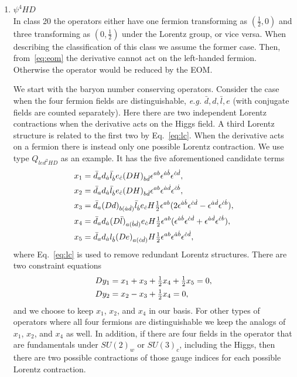 \begin{enumerate}
\item $\psi^4HD$ \\

In class 20 the operators either have one fermion transforming as $(\tfrac{1}{2}, 0)$ and three transforming as $(0, \tfrac{1}{2})$ under the Lorentz group, or vice versa.
When describing the classification of this class we assume the former case.
Then, from~\eqref{eq:eom} the derivative cannot act on the left-handed fermion.
Otherwise the operator would be reduced by the EOM.

We start with the baryon number conserving operators.
Consider the case when the four fermion fields are distinguishable, \textit{e.g.} $\bar d, d, \bar l, e$ (with conjugate fields are counted separately).
Here there are two independent Lorentz contractions when the derivative acts on the Higgs field.
A third Lorentz structure is related to the first two by Eq.~\eqref{eq:lc}.
When the derivative acts on a fermion there is instead only one possible Lorentz contraction.
We use type $Q_{led^2HD}$ as an example.
It has the five aforementioned candidate terms
\begin{align}
x_1 &= \bar d_a d_{\dot a} \bar l_{\dot b} e_{\dot c} (D H)_{b \dot d} \epsilon^{ab} \epsilon^{\dot a \dot b} \epsilon^{\dot c \dot d} , \nonumber\\ 
x_2 &= \bar d_a d_{\dot a} \bar l_{\dot b} e_{\dot c} (D H)_{b \dot d} \epsilon^{ab} \epsilon^{\dot a \dot d} \epsilon^{\dot c \dot b} , \nonumber\\ 
x_3 &= \bar d_a (D d)_{b (\dot a \dot d)} \bar l_{\dot b} e_{\dot c} H \tfrac{1}{2} \epsilon^{ab} (2 \epsilon^{\dot a \dot b} \epsilon^{\dot c \dot d} - \epsilon^{\dot a \dot d} \epsilon^{\dot c \dot b}) , \nonumber\\ 
x_4 &= \bar d_a d_{\dot a} (D \bar l)_{a (\dot b \dot d)} e_{\dot c} H \tfrac{1}{2} \epsilon^{ab} (\epsilon^{\dot a \dot b} \epsilon^{\dot c \dot d} + \epsilon^{\dot a \dot d} \epsilon^{\dot c \dot b}) , \nonumber\\ 
x_5 &= \bar d_a d_{\dot a} l_{\dot b} (D e)_{a (\dot c \dot d)} H \tfrac{1}{2} \epsilon^{ab} \epsilon^{\dot a \dot b} \epsilon^{\dot c \dot d} ,
\end{align}
where Eq.~\eqref{eq:lc} is used to remove redundant Lorentz structures.
There are two constraint equations
\begin{align}
D y_1 &= x_1 + x_3 + \tfrac{1}{2} x_4 + \tfrac{1}{2} x_5 = 0, \nonumber\\ 
D y_2 &= x_2 - x_3 + \tfrac{1}{2} x_4 = 0,
\end{align}
and we choose to keep $x_1$, $x_2$, and $x_4$ in our basis.
For other types of operators where all four fermions are distinguishable we keep the analogs of $x_1$, $x_2$, and $x_4$ as well.
In addition, if there are four fields in the operator that are fundamentals under $SU(2)_w$ or $SU(3)_c$, including the Higgs, then there are two possible contractions of those gauge indices for each possible Lorentz contraction.


\end{enumerate}
